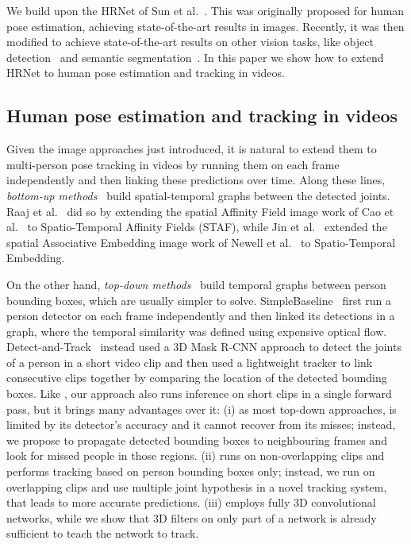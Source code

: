 \documentclass[10pt,twocolumn,letterpaper]{article}
\begin{document}
We build upon the HRNet of Sun et al.~\cite{sun2019deep}.
This was originally proposed for human pose estimation, achieving state-of-the-art results in images. Recently, it was then modified to achieve state-of-the-art results on other vision tasks, like object detection~\cite{sun2019arxiv} and semantic segmentation~\cite{wang19arxiv}. In this paper we show how to extend HRNet to human pose estimation and tracking in videos.

\subsection{Human pose estimation and tracking in videos}
Given the image approaches just introduced, it is natural to extend them to multi-person pose tracking in videos by running them on each frame independently and then linking these predictions over time. 
Along these lines, {\it bottom-up methods}~\cite{raaj2019efficient,jin2019multi} build spatial-temporal graphs between the detected joints. Raaj et al.~\cite{raaj2019efficient} did so by extending the spatial Affinity Field image work of Cao et al.~\cite{cao2018openpose} to Spatio-Temporal Affinity Fields (STAF), while Jin et al.~\cite{jin2019multi} extended the spatial Associative Embedding image work of Newell et al.~\cite{newell2017associative} to Spatio-Temporal Embedding. 

On the other hand, {\it top-down methods}~\cite{xiao2018simple,girdhar2018detecttrack} build temporal graphs between person bounding boxes, which are usually simpler to solve.     
SimpleBaseline~\cite{xiao2018simple} first run a person detector on each frame independently and then linked its detections in a graph, where the temporal similarity was defined using expensive optical flow. Detect-and-Track~\cite{girdhar2018detecttrack} instead used a 3D Mask R-CNN approach to detect the joints of a person in a short video clip and then used a lightweight tracker to link consecutive clips together by comparing the location of the detected bounding boxes. 
Like \cite{girdhar2018detecttrack}, our approach also runs inference on short clips in a single forward pass, but it brings many advantages over it: (i) as most top-down approaches, \cite{girdhar2018detecttrack} is limited by its detector's accuracy and it cannot recover from its misses; instead, we propose to propagate detected bounding boxes to neighbouring frames and look for missed people in those regions. (ii) \cite{girdhar2018detecttrack} runs on non-overlapping clips and performs tracking based on person bounding boxes only; instead, we run on overlapping clips and use multiple joint hypothesis in a novel tracking system, that leads to more accurate predictions. (iii) \cite{girdhar2018detecttrack} employs fully 3D convolutional networks, while we show that 3D filters on only part of a network is already sufficient to teach the network to track. 
\end{document}
